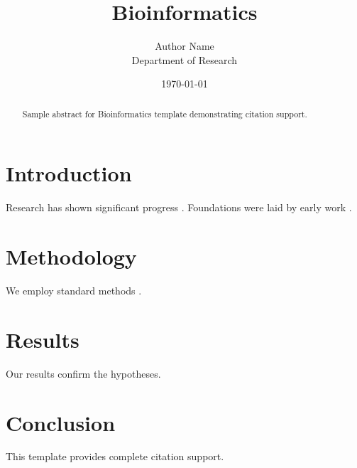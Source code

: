 \documentclass{oup}
\title{Bioinformatics}
\author{Author Name \\ \small Department of Research}
\date{\today}
\begin{document}
\maketitle

\begin{abstract}
Sample abstract for Bioinformatics template demonstrating citation support.
\end{abstract}

\section{Introduction}
Research has shown significant progress \citep{einstein1905}. Foundations were laid by early work \citep{turing1950}.

\section{Methodology}
We employ standard methods \citep{knuth1984}.

\section{Results}
Our results confirm the hypotheses.

\section{Conclusion}
This template provides complete citation support.



\end{document}
